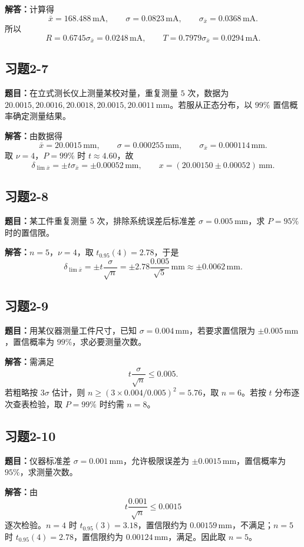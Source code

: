 \documentclass[UTF8,zihao=-4]{ctexart}
\newcommand{\problem}[1]{\subsection*{#1}}
\newcommand{\timu}{\noindent\textbf{题目：}}
\newcommand{\jieda}{\noindent\textbf{解答：}}
\begin{document}
{\jieda 计算得
\begin{equation*}
    \bar{x}=168.488\,\mathrm{mA},\qquad
    \sigma=0.0823\,\mathrm{mA},\qquad
    \sigma_{\bar{x}}=0.0368\,\mathrm{mA}.
\end{equation*}
所以
\begin{equation*}
    R=0.6745\sigma_{\bar{x}}=0.0248\,\mathrm{mA},\qquad
    T=0.7979\sigma_{\bar{x}}=0.0294\,\mathrm{mA}.
\end{equation*}

\problem{习题2-7}
\timu 在立式测长仪上测量某校对量，重复测量 $5$ 次，数据为 \\$20.0015,20.0016,20.0018,20.0015,20.0011\,\mathrm{mm}$。若服从正态分布，以 $99\%$ 置信概率确定测量结果。

\jieda 由数据得
\begin{equation*}
    \bar{x}=20.0015\,\mathrm{mm},\qquad
    \sigma=0.000255\,\mathrm{mm},\qquad
    \sigma_{\bar{x}}=0.000114\,\mathrm{mm}.
\end{equation*}
取 $\nu=4$，$P=99\%$ 时 $t\approx4.60$，故
\begin{equation*}
    \delta_{\lim\bar{x}}=\pm t\sigma_{\bar{x}}=\pm0.00052\,\mathrm{mm},
    \qquad
    x=(20.00150\pm0.00052)\,\mathrm{mm}.
\end{equation*}

\problem{习题2-8}
\timu 某工件重复测量 $5$ 次，排除系统误差后标准差 $\sigma=0.005\,\mathrm{mm}$，求 $P=95\%$ 时的置信限。

\jieda $n=5$，$\nu=4$，取 $t_{0.95}(4)=2.78$，于是
\begin{equation*}
    \delta_{\lim\bar{x}}=\pm t\frac{\sigma}{\sqrt{n}}
    =\pm2.78\frac{0.005}{\sqrt{5}}\,\mathrm{mm}
    \approx\pm0.0062\,\mathrm{mm}.
\end{equation*}

\problem{习题2-9}
\timu 用某仪器测量工件尺寸，已知 $\sigma=0.004\,\mathrm{mm}$，若要求置信限为 $\pm0.005\,\mathrm{mm}$，置信概率为 $99\%$，求必要测量次数。

\jieda 需满足
\begin{equation*}
    t\frac{\sigma}{\sqrt{n}}\le0.005.
\end{equation*}
若粗略按 $3\sigma$ 估计，则 $n\ge(3\times0.004/0.005)^2=5.76$，取 $n=6$。若按 $t$ 分布逐次查表检验，取 $P=99\%$ 时约需 $n=8$。

\problem{习题2-10}
\timu 仪器标准差 $\sigma=0.001\,\mathrm{mm}$，允许极限误差为 $\pm0.0015\,\mathrm{mm}$，置信概率为 $95\%$，求测量次数。

\jieda 由
\begin{equation*}
    t\frac{0.001}{\sqrt n}\le0.0015
\end{equation*}
逐次检验。$n=4$ 时 $t_{0.95}(3)=3.18$，置信限约为 $0.00159\,\mathrm{mm}$，不满足；$n=5$ 时 $t_{0.95}(4)=2.78$，置信限约为 $0.00124\,\mathrm{mm}$，满足。因此取 $n=5$。

}
\end{document}
